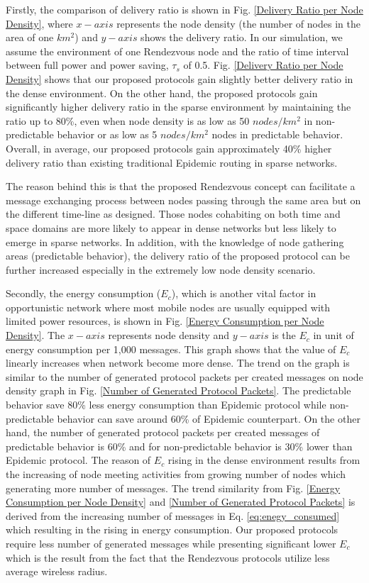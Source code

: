 \documentclass[conference]{IEEEtran}
\begin{document}
Firstly, the comparison of delivery ratio is shown in Fig. \ref{Delivery Ratio per Node Density}, where $x-axis$ represents the node density (the number of nodes in the area of one $km^2$) and $y-axis$ shows the delivery ratio.
%
In our simulation, we assume the environment of one Rendezvous node and the ratio of time interval between full power and power saving, $\tau_s$ of 0.5.
%
Fig. \ref{Delivery Ratio per Node Density} shows that our proposed protocols gain slightly better delivery ratio in the dense environment.
%
On the other hand, the proposed protocols gain significantly higher delivery ratio in the sparse environment by maintaining the ratio up to 80\%, even when node density is as low as 50 $nodes/km^2$ in non-predictable behavior or as low as 5 $nodes/km^2$ nodes in predictable behavior.
%
Overall, in average, our proposed protocols gain approximately 40\% higher delivery ratio than existing traditional Epidemic routing in sparse networks.

The reason behind this is that the proposed Rendezvous concept can facilitate a message exchanging process between nodes passing through the same area but on the different time-line as designed.
Those nodes cohabiting on both time and space domains are more likely to appear in dense networks but less likely to emerge in sparse networks.
In addition, with the knowledge of node gathering areas (predictable behavior), the delivery ratio of the proposed protocol can be further increased especially in the extremely low node density scenario. 

Secondly, the energy consumption ($E_c$), which is another vital factor in opportunistic network where most mobile nodes are usually equipped with limited power resources, is shown in Fig. \ref{Energy Consumption per Node Density}.
The $x-axis$ represents node density and $y-axis$ is the $E_c$ in unit of energy consumption per 1,000 messages.
This graph shows that the value of $E_c$ linearly increases when network become more dense.
The trend on the graph is similar to the number of generated protocol packets per created messages on node density graph in Fig. \ref{Number of Generated Protocol Packets}.
The predictable behavior save 80\% less energy consumption than Epidemic protocol while non-predictable behavior can save around 60\% of Epidemic counterpart.
On the other hand, the number of generated protocol packets per created messages of predictable behavior is 60\% and for non-predictable behavior is 30\% lower than Epidemic protocol.
The reason of $E_c$ rising in the dense environment results from the increasing of node meeting activities from growing number of nodes which generating more number of messages.
%
The trend similarity from Fig. \ref{Energy Consumption per Node Density} and \ref{Number of Generated Protocol Packets} is derived from the increasing number of messages in Eq. \ref{eq:enegy_consumed} which resulting in the rising in energy consumption. 
Our proposed protocols require less number of generated messages while presenting significant lower $E_c$ which is the result from the fact that the Rendezvous protocols utilize less average wireless radius.
\end{document}
